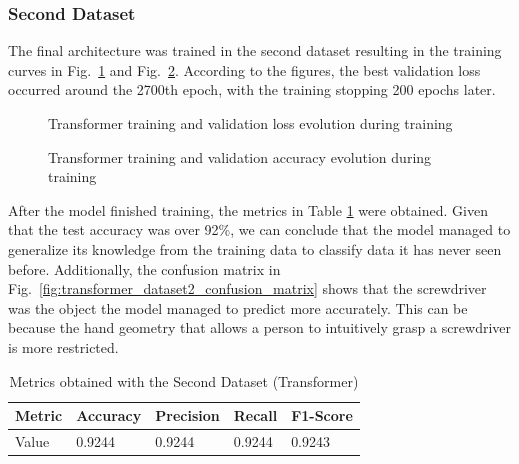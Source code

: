 \subsubsection{Second Dataset}

The final architecture was trained in the second dataset resulting in the training curves in Fig.~\ref{fig:transformer_loss} and Fig.~\ref{fig:transformer_acc}. According to the figures, the best validation loss occurred around the 2700th epoch, with the training stopping 200 epochs later.

\begin{figure}[H]
    \centering
    {\fontsize{10}{12}\selectfont}
    \caption[Transformer training and validation loss evolution during training]{Transformer training and validation loss evolution during training}
    \label{fig:transformer_loss}
\end{figure}

\begin{figure}[H]
    \centering
    {\fontsize{10}{12}\selectfont}
    \caption[Transformer training and validation accuracy evolution during training]{Transformer training and validation accuracy evolution during training}
    \label{fig:transformer_acc}
\end{figure}

After the model finished training, the metrics in Table \ref{table:transformer_dataset2_results} were obtained. Given that the test accuracy was over 92\%, we can conclude that the model managed to generalize its knowledge from the training data to classify data it has never seen before. Additionally, the confusion matrix in Fig.~\ref{fig:transformer_dataset2_confusion_matrix} shows that the screwdriver was the object the model managed to predict more accurately. This can be because the hand geometry that allows a person to intuitively grasp a screwdriver is more restricted.

\begin{table}[H]
    \centering
    \caption{Metrics obtained with the Second Dataset (Transformer)}
    \label{table:transformer_dataset2_results}
    \begin{tabular}{|l|l|l|l|l|}
        \hline
        Metric & Accuracy & Precision & Recall & F1-Score \\
        \hline
        Value & 0.9244 & 0.9244 & 0.9244 & 0.9243 \\
        \hline
    \end{tabular}
\end{table}

